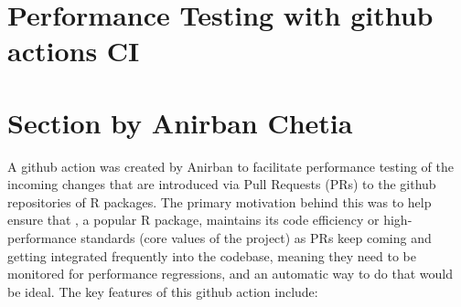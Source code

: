 \section{Performance Testing with github actions CI}
\section{Section by Anirban Chetia}

A github action was created by Anirban to facilitate performance testing of the incoming changes that are introduced via Pull Requests (PRs) to the github repositories of R packages. The primary motivation behind this was to help ensure that , a popular R package, maintains its code efficiency or high-performance standards (core values of the project) as PRs keep coming and getting integrated frequently into the codebase, meaning they need to be monitored for performance regressions, and an automatic way to do that would be ideal.
\newline
\newline
The key features of this github action include:

